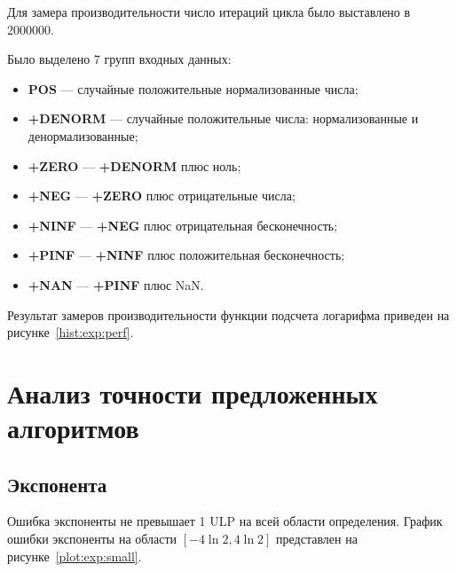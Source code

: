 Для замера производительности число итераций цикла было выставлено в 2000000.

Было выделено 7 групп входных данных:

\begin{itemize}
    \item \textbf{POS} --- случайные положительные нормализованные числа;
    \item \textbf{+DENORM} --- случайные положительные числа: нормализованные и денормализованные;
    \item \textbf{+ZERO} --- \textbf{+DENORM} плюс ноль;
    \item \textbf{+NEG} --- \textbf{+ZERO} плюс отрицательные числа;
    \item \textbf{+NINF} --- \textbf{+NEG} плюс отрицательная бесконечность;
    \item \textbf{+PINF} --- \textbf{+NINF} плюс положительная бесконечность;
    \item \textbf{+NAN} --- \textbf{+PINF} плюс NaN.
\end{itemize}

Результат замеров производительности функции подсчета логарифма приведен на рисунке~\ref{hist:exp:perf}.

\section{Анализ точности предложенных алгоритмов}

\subsection{Экспонента}

Ошибка экспоненты не превышает 1 ULP на всей области определения.
График ошибки экспоненты на области $[-4\ln{2}, 4\ln{2}]$ представлен на рисунке~\ref{plot:exp:small}.

